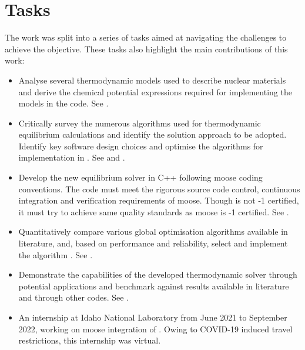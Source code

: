\section{Tasks}
    The work was split into a series of tasks aimed at navigating the challenges to achieve the objective. These tasks also highlight the main contributions of this work:
    \begin{itemize}
        \item Analyse several thermodynamic models used to describe nuclear materials and derive the chemical potential expressions required for implementing the models in the code. See .
        \item Critically survey the numerous algorithms used for thermodynamic equilibrium calculations and identify the solution approach to be adopted. Identify key software design choices and optimise the algorithms for implementation in {\GEM}. See  and .
        \item Develop the new equilibrium solver in C++ following \gls{moose} coding conventions. The code must meet the rigorous source code control, continuous integration and verification requirements of \gls{moose}. Though {\GEM} is not -{1} certified, it must try to achieve same quality standards as \gls{moose} is -{1} certified. See .
        \item Quantitatively compare various global optimisation algorithms available in literature, and, based on performance and reliability, select and implement the algorithm {\GEM}. See .
        \item Demonstrate the capabilities of the developed thermodynamic solver through potential applications and benchmark against results available in literature and through other codes. See .
        \item An internship at Idaho National Laboratory from June 2021 to September 2022, working on \gls{moose} integration of \GEM. Owing to COVID-19 induced travel restrictions, this internship was virtual.
    \end{itemize}

